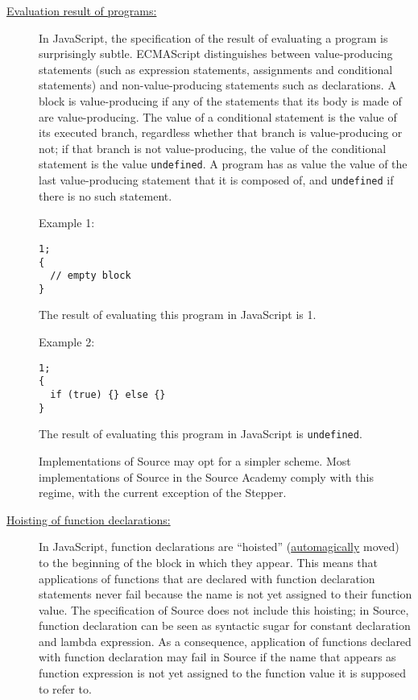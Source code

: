 \begin{description}
\item[\href{https://source-academy.github.io/sicp/chapters/4.1.1.html\#footnote-4}{Evaluation result of programs:}] In JavaScript,
  the specification of the result of evaluating a program is surprisingly
  subtle. ECMAScript distinguishes between value-producing statements
  (such as expression statements, assignments and conditional statements)
  and non-value-producing statements such as declarations. A block is
  value-producing if any of the statements that its body is made of
  are value-producing. The value of a conditional statement is the
  value of its executed branch, regardless whether that branch is
  value-producing or not; if that branch is not value-producing, the value of
  the conditional statement is the value \texttt{undefined}.
  A program  has as value the value of the last value-producing statement
  that it is composed of, and \texttt{undefined} if there is no
  such statement.

  Example 1:
  \begin{lstlisting}
1;
{
  // empty block
}
  \end{lstlisting}
  The result of evaluating this program in JavaScript is 1.

  Example 2:
  \begin{lstlisting}
1;
{
  if (true) {} else {}
}
  \end{lstlisting}
  The result of evaluating this program in JavaScript is \texttt{undefined}.

  Implementations of Source may opt for a simpler scheme. Most implementations
  of Source in the Source Academy comply with this regime, with the current
  exception of the Stepper.

\item[\href{https://source-academy.github.io/sicp/chapters/1.3.2.html\#footnote-2}{Hoisting of function declarations:}] In JavaScript, function declarations
  are ``hoisted''
  (\href{https://source-academy.github.io/sicp/chapters/4.3.1.html#footnote-4}{automagically} moved)
  to the beginning of the block in which
  they appear. This means that applications of functions that are declared
  with function declaration statements never fail because the name is not
  yet assigned to their function value. The specification of Source does 
  not include this hoisting; in Source, function declaration can be seen as
  syntactic sugar for constant declaration and lambda expression.
  As a consequence, application of functions declared with function declaration
  may fail in Source if the name that appears as function expression is not yet
  assigned to the function value it is supposed to refer to.
\end{description}
